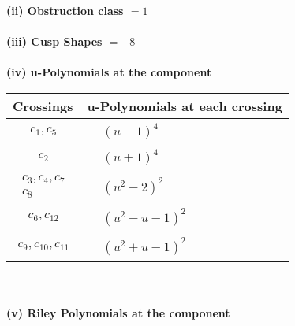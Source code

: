 \documentclass[1p]{elsarticle_modified}
\theoremstyle{definition}
\begin{document}
\flushleft \textbf{(ii) Obstruction class $= 1$}\\~\\
\flushleft \textbf{(iii) Cusp Shapes $= -8$}\\~\\
\newpage\renewcommand{\arraystretch}{1}
\flushleft \textbf{(iv) u-Polynomials at the component}\newline \\
\begin{tabular}{m{50pt}|m{274pt}}
Crossings & \hspace{64pt}u-Polynomials at each crossing \\
\hline $$\begin{aligned}c_{1},c_{5}\end{aligned}$$&$\begin{aligned}
&(u-1)^4
\end{aligned}$\\
\hline $$\begin{aligned}c_{2}\end{aligned}$$&$\begin{aligned}
&(u+1)^4
\end{aligned}$\\
\hline $$\begin{aligned}c_{3},c_{4},c_{7}\\c_{8}\end{aligned}$$&$\begin{aligned}
&(u^2-2)^2
\end{aligned}$\\
\hline $$\begin{aligned}c_{6},c_{12}\end{aligned}$$&$\begin{aligned}
&(u^2- u-1)^2
\end{aligned}$\\
\hline $$\begin{aligned}c_{9},c_{10},c_{11}\end{aligned}$$&$\begin{aligned}
&(u^2+u-1)^2
\end{aligned}$\\
\hline
\end{tabular}\\~\\
\newpage\renewcommand{\arraystretch}{1}
\flushleft \textbf{(v) Riley Polynomials at the component}\newline \\
\end{document}

